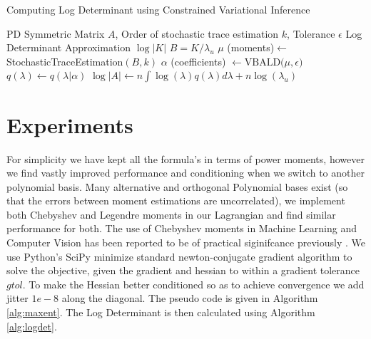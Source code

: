 \documentclass[letterpaper]{article} %
\begin{document}
\begin{algorithm}
	\caption{Computing Log Determinant using Constrained Variational Inference}\label{alg:logdet}
	\begin{algorithmic}[1]
		\vspace{0.5em}
		 PD Symmetric Matrix $A$, Order of stochastic trace estimation $k$, Tolerance $\epsilon$
		 Log Determinant Approximation $\log|K|$
		\STATE $B = K/\lambda_{u}$
		\STATE $\mu$ (moments)$ \gets$ StochasticTraceEstimation$(B, k)$ 
		\STATE $\alpha$ (coefficients) $\gets \text{VBALD(}\mu, \epsilon)$
		\STATE $q(\lambda) \gets q(\lambda | \alpha)$
		\STATE $\log|A| \gets n\int \log(\lambda) q(\lambda) d\lambda + n\log(\lambda_{u})$
	\end{algorithmic}
\end{algorithm}

\section{Experiments}
For simplicity we have kept all the formula's in terms of power moments, however we find vastly improved performance and conditioning when we switch to another polynomial basis. Many alternative and orthogonal Polynomial bases exist (so that the errors between moment estimations are uncorrelated), we implement both Chebyshev and Legendre moments in our Lagrangian and find similar performance for both. The use of Chebyshev moments in Machine Learning and Computer Vision has been reported to be of practical siginifcance previously \cite{yap2001chebyshev}. We use Python's SciPy minimize standard newton-conjugate gradient algorithm to solve the objective, given the gradient and hessian to within a gradient tolerance $gtol$. To make the Hessian better conditioned so as to achieve convergence we add jitter $1e-8$ along the diagonal. The pseudo code is given in Algorithm \ref{alg:maxent}. The Log Determinant is then calculated using Algorithm \ref{alg:logdet}.
\end{document}
